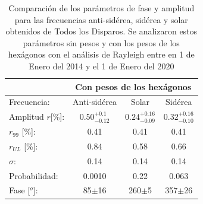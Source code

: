 \begin{table}[H]
\begin{tabular}{rc|c|c|}
			\multicolumn{1}{r|}{} & \multicolumn{3}{c|}{Con pesos de los hexágonos} \\ \hline
			\multicolumn{1}{|l|}{Frecuencia:      } & Anti-sidérea          & Solar        	 				& Sidérea        \\ \hline
			\multicolumn{1}{|l|}{Amplitud $r$[\%]:} & $0.50^{+0.1}_{-0.12}$& $0.24^{+0.16}_{-0.09}$        & $0.32^{+0.16}_{-0.10}$ \\
			\multicolumn{1}{|l|}{$r_{99}$ [\%]:   } & 0.41                  & 0.41                          & 0.41       \\
			\multicolumn{1}{|l|}{$r_{UL}$ [\%]:   } & 0.84                  & 0.58                          & 0.66       \\
			\multicolumn{1}{|l|}{$\sigma$:        } & 0.14                  & 0.14                          & 0.14          \\\hline
			\multicolumn{1}{|l|}{Probabilidad:    } & 0.0010                & 0.22                          & 0.063          \\
			\multicolumn{1}{|l|}{Fase [$^o$]:            } & 85$\pm$16             & 260$\pm$5                    & 357$\pm$26    \\\hline 		
		\end{tabular}
		\caption{Comparación de los parámetros de fase y amplitud para las frecuencias anti-sidérea, sidérea y solar obtenidos de Todos los Disparos. Se analizaron estos parámetros sin pesos y con los pesos de los hexágonos con el análisis de Rayleigh entre en 1 de Enero del 2014 y el 1 de Enero del 2020}
		\label{table:parametros_rayleigh}
		\end{table}

